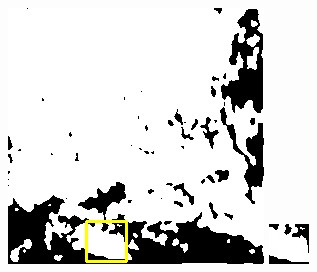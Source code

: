 \documentclass[UTF8]{ctexart}
\begin{document}
\begin{figure}[H]
{\begin{minipage}[b]{0.15\linewidth}
            \includegraphics[width=1\linewidth]{../log/spoon2/cut2/LC81620432014072LGN00_16237_unet.jpg}\vspace{4pt}
            \includegraphics[width=1\linewidth]{../log/spoon2/cut2/tmp_cut_LC81620432014072LGN00_16237_unet.jpg}\vspace{4pt}

\end{minipage}}
\end{figure}
\end{document}

